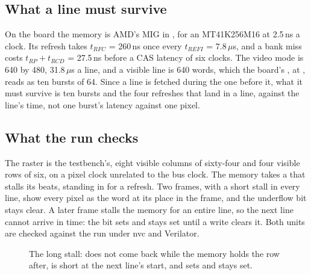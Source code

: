 

\subsection{What a line must survive}

On the board the memory is AMD's MIG in , for an
MT41K256M16 at 2.5\,ns a clock. Its refresh takes $t_{RFC}$ =
260\,ns once every $t_{REFI}$ = 7.8\,$\mu$s, and a bank
miss costs $t_{RP} + t_{RCD}$ = 27.5\,ns before a CAS latency of
six clocks. The video mode is 640 by 480, 31.8\,$\mu$s a line,
and a visible line is 640 words, which the board's
, at , reads as ten bursts of 64. Since a
line is fetched during the one before it, what it must survive is
ten bursts and the four refreshes that land in a line, against the
line's time, not one burst's latency against one pixel.

\subsection{What the run checks}

The raster is the testbench's, eight visible columns of sixty-four
and four visible rows of six, on a pixel clock unrelated to the bus
clock. The memory takes a  that stalls its beats, standing
in for a refresh. Two frames, with a short stall in every line, show
every pixel as the word at its place in the frame, and the underflow
bit stays clear. A later frame stalls the memory for an entire
line, so the next line cannot arrive in time: the bit sets and stays
set until a write clears it. Both units are checked against the run
under nvc and Verilator.

\begin{figure}[htbp]
\centering

\caption{The long stall:  does not come back while the
memory holds the row after,  is short at the next line's
start, and  sets and stays set.}
\label{fig:x-scanpair}
\end{figure}




